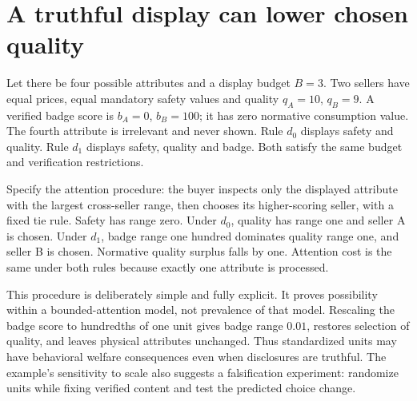 \documentclass[11pt,a4paper]{article}
\begin{document}
\section{A truthful display can lower chosen quality}
Let there be four possible attributes and a display budget $B=3$. Two sellers have equal prices, equal mandatory safety values and quality $q_A=10$, $q_B=9$. A verified badge score is $b_A=0$, $b_B=100$; it has zero normative consumption value. The fourth attribute is irrelevant and never shown. Rule $d_0$ displays safety and quality. Rule $d_1$ displays safety, quality and badge. Both satisfy the same budget and verification restrictions.

Specify the attention procedure: the buyer inspects only the displayed attribute with the largest cross-seller range, then chooses its higher-scoring seller, with a fixed tie rule. Safety has range zero. Under $d_0$, quality has range one and seller A is chosen. Under $d_1$, badge range one hundred dominates quality range one, and seller B is chosen. Normative quality surplus falls by one. Attention cost is the same under both rules because exactly one attribute is processed.

This procedure is deliberately simple and fully explicit. It proves possibility within a bounded-attention model, not prevalence of that model. Rescaling the badge score to hundredths of one unit gives badge range $0.01$, restores selection of quality, and leaves physical attributes unchanged. Thus standardized units may have behavioral welfare consequences even when disclosures are truthful. The example's sensitivity to scale also suggests a falsification experiment: randomize units while fixing verified content and test the predicted choice change.
\end{document}
